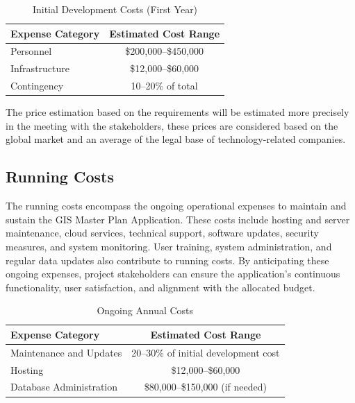 \begin{table}[ht!]
    \centering
    \begin{tabular}{|l|c|}
        \hline
        \textbf{Expense Category} & \textbf{Estimated Cost Range} \\
        \hline
        Personnel & \$200,000--\$450,000 \\
        \hline
        Infrastructure & \$12,000--\$60,000 \\
        \hline
        Contingency & 10--20\% of total \\
        \hline
    \end{tabular}
    \caption{Initial Development Costs (First Year)}\label{tab:init-develop-costs}
\end{table}

The price estimation based on the requirements will be estimated more precisely in the meeting with the stakeholders, these prices are considered based on the global market and an average of the legal base of technology-related companies.

\subsection{Running Costs}\label{subsec:running-costs}
The running costs encompass the ongoing operational expenses to maintain and sustain the GIS Master Plan Application.
These costs include hosting and server maintenance, cloud services, technical support, software updates, security measures, and system monitoring. 
User training, system administration, and regular data updates also contribute to running costs. 
By anticipating these ongoing expenses, project stakeholders can ensure the application's continuous functionality, user satisfaction, and alignment with the allocated budget.

\begin{table}[h]
    \centering
    \begin{tabular}{|l|c|}
        \hline
        \textbf{Expense Category} & \textbf{Estimated Cost Range} \\
        \hline
        Maintenance and Updates & 20--30\% of initial development cost \\
        \hline
        Hosting & \$12,000--\$60,000 \\
        \hline
        Database Administration & \$80,000--\$150,000 (if needed) \\
        \hline
    \end{tabular}
    \caption{Ongoing Annual Costs}\label{tab:running-costs}
\end{table}